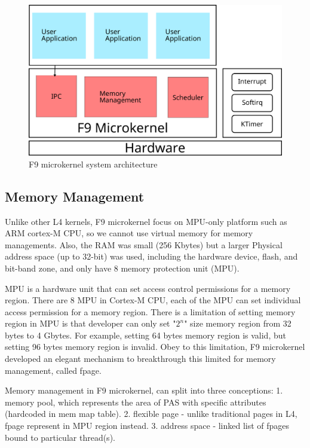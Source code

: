 \documentclass[10pt,preprint,nocopyrightspace]{sigplanconf}
\begin{document}
\begin{figure}[H]
	\begin{center}
		\includegraphics[width=\linewidth]{picture/f9_arch.png}
	\end{center}
	\caption{F9 microkernel system architecture}
	\label{fig:f9}
\end{figure}

\subsection{Memory Management}

Unlike other L4 kernels, F9 microkernel focus on MPU-only platform such as ARM cortex-M CPU, so we cannot use virtual memory for memory managements. Also, the RAM was small (256 Kbytes) but a larger Physical address space (up to 32-bit) was used, including the hardware device, flash, and bit-band zone, and only have 8 memory protection unit (MPU)\cite{arm2016mpu,yiu2013definitive,st2016managing,usna2015l18}.

MPU is a hardware unit that can set access control permissions for a memory region. There are 8 MPU in Cortex-M CPU, each of the MPU can set individual access permission for a memory region. There is a limitation of setting memory region in MPU is that developer can only set "$2^n$" size memory region from 32 bytes to 4 Gbytes\cite{yiu2013definitive,st2016managing}. For example, setting 64 bytes memory region is valid, but setting 96 bytes memory region is invalid. Obey to this limitation, F9 microkernel developed an elegant mechanism to breakthrough this limited for memory management, called fpage.

Memory management in F9 microkernel, can split into three conceptions: 1. memory pool, which represents the area of PAS with specific attributes (hardcoded in mem map table). 2. flexible page - unlike traditional pages in L4, fpage represent in MPU region instead. 3. address space - linked list of fpages bound to particular thread(s).
\end{document}
